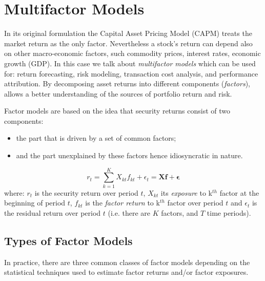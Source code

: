 \section{Multifactor Models}

In its original formulation the Capital Asset Pricing Model (CAPM) treats the market return as the only factor. Nevertheless a stock’s return can depend also on other macro-economic factors, such commodity prices, interest rates, economic growth (GDP). In this case we talk about \emph{multifactor models} which can be used for: return forecasting, risk modeling, transaction cost analysis, and performance attribution. 
By decomposing asset returns into different components (\emph{factors}), allows a better understanding of the sources of portfolio return and risk. 

Factor models are based on the idea that security returns consist of two components:
\begin{itemize}
\tightlist
\item the part that is driven by a set of common factors;
\item and the part unexplained by these factors hence idiosyncratic in nature. 
\end{itemize}
\begin{equation}
r_{t} = \sum_{k=1}^{K} X_{kt} f_{kt} + \epsilon_{t} = \mathbf{Xf} + \boldsymbol{\epsilon}
\label{eq:multifactor}
\end{equation}
where: $r_{t}$ is the security return over period $t$, $X_{kt}$ its \emph{exposure} to k$^{th}$ factor at the beginning of period $t$, $f_{kt}$ is the \emph{factor return} to k$^{th}$ factor over period $t$ and $\epsilon_{t}$ is the residual return over period $t$ (i.e. there are $K$ factors, and $T$ time periods).

\subsection{Types of Factor Models}

In practice, there are three common classes of factor models depending on the statistical techniques used to estimate factor returns and/or factor exposures.


